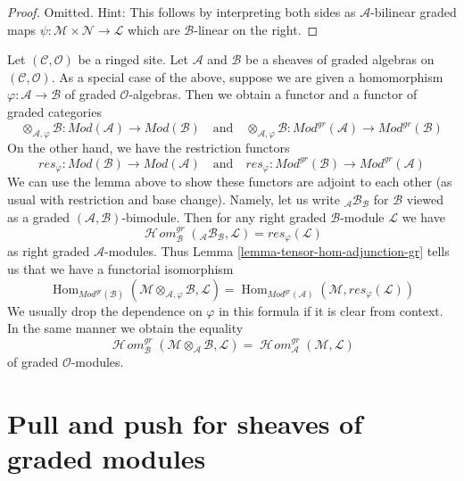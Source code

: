 \documentclass{stacks-project}
\theoremstyle{plain}
\theoremstyle{definition}
\theoremstyle{remark}
\numberwithin{equation}{subsection}
\def\Hom{\mathop{\mathrm{Hom}}\nolimits}
\def\SheafHom{\mathop{\mathcal{H}\!\mathit{om}}\nolimits}
\begin{document}
\begin{proof}
Omitted. Hint: This follows by interpreting both sides as
$\mathcal{A}$-bilinear graded maps
$\psi : \mathcal{M} \times \mathcal{N} \to \mathcal{L}$
which are $\mathcal{B}$-linear on the right.
\end{proof}

\noindent
Let $(\mathcal{C}, \mathcal{O})$ be a ringed site. Let $\mathcal{A}$
and $\mathcal{B}$ be a sheaves of graded algebras on
$(\mathcal{C}, \mathcal{O})$.
As a special case of the above, suppose we are given
a homomorphism $\varphi : \mathcal{A} \to \mathcal{B}$
of graded $\mathcal{O}$-algebras. Then we obtain a functor
and a functor of graded categories
$$
\otimes_{\mathcal{A}, \varphi} \mathcal{B} :
\textit{Mod}(\mathcal{A})
\longrightarrow
\textit{Mod}(\mathcal{B})
\quad\text{and}\quad
\otimes_{\mathcal{A}, \varphi} \mathcal{B} :
\textit{Mod}^{gr}(\mathcal{A})
\longrightarrow
\textit{Mod}^{gr}(\mathcal{B})
$$
On the other hand, we have the restriction functors
$$
res_\varphi :
\textit{Mod}(\mathcal{B})
\longrightarrow
\textit{Mod}(\mathcal{A})
\quad\text{and}\quad
res_\varphi :
\textit{Mod}^{gr}(\mathcal{B})
\longrightarrow
\textit{Mod}^{gr}(\mathcal{A})
$$
We can use the lemma above to show these functors are adjoint to
each other (as usual with restriction and base change). Namely,
let us write ${}_\mathcal{A}\mathcal{B}_\mathcal{B}$ for
$\mathcal{B}$ viewed as a graded $(\mathcal{A}, \mathcal{B})$-bimodule.
Then for any right graded $\mathcal{B}$-module $\mathcal{L}$
we have
$$
\SheafHom_\mathcal{B}^{gr}({}_\mathcal{A}\mathcal{B}_\mathcal{B}, \mathcal{L})
= res_\varphi(\mathcal{L})
$$
as right graded $\mathcal{A}$-modules. Thus
Lemma \ref{lemma-tensor-hom-adjunction-gr}
tells us that we have a functorial isomorphism
$$
\Hom_{\textit{Mod}^{gr}(\mathcal{B})}(
\mathcal{M} \otimes_{\mathcal{A}, \varphi} \mathcal{B}, \mathcal{L}) =
\Hom_{\textit{Mod}^{gr}(\mathcal{A})}(
\mathcal{M}, res_\varphi(\mathcal{L}))
$$
We usually drop the dependence on $\varphi$ in this formula if it
is clear from context. In the same manner we obtain
the equality
$$
\SheafHom^{gr}_\mathcal{B}(
\mathcal{M} \otimes_\mathcal{A} \mathcal{B}, \mathcal{L}) =
\SheafHom_\mathcal{A}^{gr}(\mathcal{M}, \mathcal{L})
$$
of graded $\mathcal{O}$-modules.




\section{Pull and push for sheaves of graded modules}
\label{section-functoriality-graded}
\end{document}
